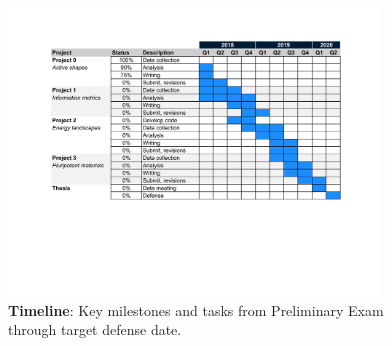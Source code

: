 \documentclass[11pt]{article}   	%
\begin{document}
\begin{figure}[h!]
\begin{center}
\includegraphics[height=3in]{../figures/gantt.pdf}
\caption{\textbf{Timeline}: Key milestones and tasks from Preliminary Exam through target defense date.}
\label{fig:gantt}
\end{center}
\end{figure}

\newpage


\end{document}
